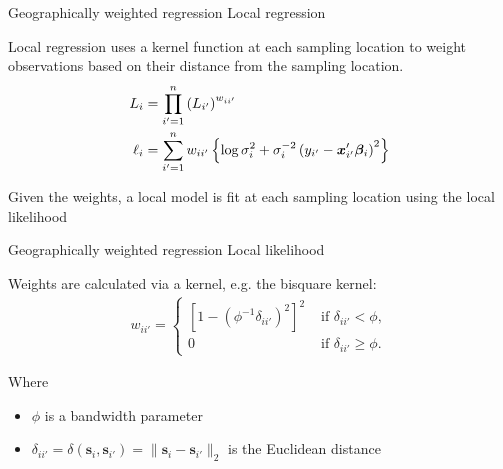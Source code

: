 \documentclass[12pt,t]{beamer}
\newcommand{\subt}[1]{{\footnotesize \color{subtitle} {#1}}}
\begin{document}
\begin{frame}{Geographically weighted regression}
\subt{Local regression \citep{Loader:1999}}

\bigskip
Local regression uses a kernel function at each sampling location to weight observations based on their distance from the sampling location.
\begin{align}
    L_i &= \prod_{i'=1}^n \left(L_{i'}\right)^{w_{ii'}} \notag \\
    \ell_i &= \sum_{i'=1}^n w_{ii'} \left\{\log \sigma_i^{2} + \sigma_i^{-2}\left(y_{i'} - \bm{x}_{i'}'\bm{\beta}_i\right)^2 \right\} \notag
\end{align}

Given the weights, a local model is fit at each sampling location using the local likelihood

\end{frame}






\begin{frame}{Geographically weighted regression}
\subt{Local likelihood\citep{Loader:1999}}

\bigskip
Weights are calculated via a kernel, e.g. the bisquare kernel:
\begin{align}
	w_{ii'} = \begin{cases} \left[1-\left(\phi^{-1}\delta_{ii'}\right)^2\right]^2 &\mbox{ if } \delta_{ii'} < \phi, \\ 0 &\mbox{ if } \delta_{ii'} \geq \phi. \end{cases}
\end{align}

Where
\begin{itemize}
  \item $\phi$ is a bandwidth parameter
  \item $\delta_{ii'} = \delta(\bm{s}_i,\bm{s}_{i'}) = \|\bm{s}_i - \bm{s}_{i'}\|_2$ is the Euclidean distance
\end{itemize}

\end{frame}
\end{document}
